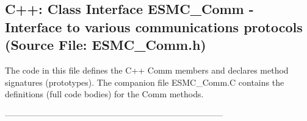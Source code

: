  
\parskip        0pt
\parindent      0pt
\baselineskip  11pt
 
\def\bv{\begin{verbatim}}
\def\ev{\end{verbatim}}
\def\be{\begin{equation}}
\def\ee{\end{equation}}
\def\bea{\begin{eqnarray}}
\def\eea{\end{eqnarray}}
\def\bi{\begin{itemize}}
\def\ei{\end{itemize}}
\def\bn{\begin{enumerate}}
\def\en{\end{enumerate}}
\def\bd{\begin{description}}
\def\ed{\end{description}}
\def\({\left (}
\def\){\right )}
\def\[{\left [}
\def\]{\right ]}
\def\<{\left  \langle}
\def\>{\right \rangle}
\def\cI{{\cal I}}
\def\diag{\mathop{\rm diag}}
\def\tr{\mathop{\rm tr}}


 
\subsection{C++:  Class Interface ESMC\_Comm - Interface to various communications protocols (Source File: ESMC\_Comm.h)}


  
  
   The code in this file defines the C++ Comm members and declares method 
   signatures (prototypes).  The companion file ESMC\_Comm.C contains
   the definitions (full code bodies) for the Comm methods.
  
   
  
  -----------------------------------------------------------------------------
   
